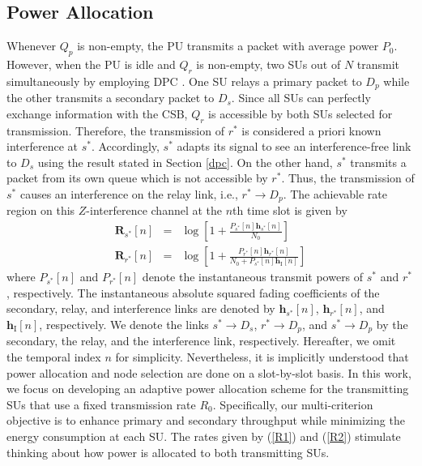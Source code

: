 \documentclass[journal,twocolumn]{IEEEtran}
\begin{document}
\subsection{Power Allocation}
Whenever $Q_{p}$ is non-empty, the PU transmits a packet with average power $P_{0}$. However, when the PU is idle and $Q_{r}$ is non-empty, two SUs out of $N$ transmit simultaneously by employing DPC \cite{DPC}. One SU relays a primary packet to $D_{p}$ while the other transmits a secondary packet to $D_{s}$. Since all SUs can perfectly exchange information with the CSB, $Q_{r}$ is accessible by both SUs selected for transmission. Therefore, the transmission of $r^*$ is considered a priori known interference at $s^*$. Accordingly, $s^*$ adapts its signal to see an interference-free link to $D_s$ using the result stated in Section \ref{dpc}. On the other hand, $s^*$ transmits a packet from its own queue which is not accessible by $r^*$. Thus, the transmission of $s^*$ causes an interference on the relay link, i.e., $r^* \rightarrow D_{p}$. The achievable rate region on this $Z$-interference channel at the $n$th time slot is given by
\begin{eqnarray}
\mathbf{R}_{s^*}[n]&=& \log \left[ 1 + \frac{P_{s^*}[n]\mathbf{h}_{s^*}[n]}{N_{0}} \right] \label{R1} \\
\mathbf{R}_{r^*}[n]&=& \log \left[ 1 + \frac{P_{r^*}[n]\mathbf{h}_{r^*}[n]}
{N_{0}+ P_{s^*}[n]\mathbf{h}_{\mathrm{I}}[n]} \right] \label{R2}
\end{eqnarray}
where $P_{s^*}[n]$ and $P_{r^*}[n]$ denote the instantaneous transmit powers of $s^*$ and $r^*$, respectively. The instantaneous absolute squared fading coefficients of the secondary, relay, and interference links are denoted by $\mathbf{h}_{s^*}[n]$, $\mathbf{h}_{r^*}[n]$, and $\mathbf{h}_{\mathrm{I}}[n]$, respectively. We denote the links $s^* \to D_{s}$, $r^* \to D_{p}$, and $s^* \to D_{p}$ by the secondary, the relay, and the interference link, respectively. 
Hereafter, we omit the temporal index $n$ for simplicity. Nevertheless, it is implicitly understood that power allocation and node selection are done on a slot-by-slot basis. In this work, we focus on developing an adaptive power allocation scheme for the transmitting SUs that use a fixed transmission rate $R_{0}$. Specifically, our multi-criterion objective is to enhance primary and secondary throughput while minimizing the energy consumption at each SU. The rates given by (\ref{R1}) and (\ref{R2}) stimulate thinking about how power is allocated to both transmitting SUs.
\end{document}
